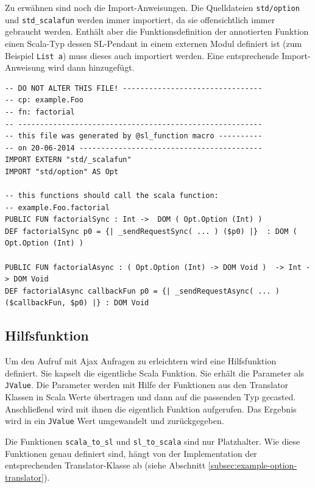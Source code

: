 \documentclass[12pt,bibtotoc]{scrreprt}
\begin{document}
Zu erwähnen sind noch die Import-Anweisungen. Die Quelldateien \lstinline!std/option! und \lstinline!std_scalafun! werden immer importiert, da sie offensichtlich immer gebraucht werden. Enthält aber die Funktionsdefinition der annotierten Funktion einen Scala-Typ dessen SL-Pendant in einem externen Modul definiert ist (zum Beispiel \lstinline!List a!) muss dieses auch importiert werden. Eine entsprechende Import-Anweisung wird dann hinzugefügt.

\begin{lstlisting}[caption=SL-Modul factorial.sl zur Funktion aus Listing \ref{lst:example-function}, label=lst:example-sl-modul, float=h]
-- DO NOT ALTER THIS FILE! --------------------------------
-- cp: example.Foo
-- fn: factorial
-- --------------------------------------------------------
-- this file was generated by @sl_function macro ----------
-- on 20-06-2014 ------------------------------------------
IMPORT EXTERN "std/_scalafun"
IMPORT "std/option" AS Opt

-- this functions should call the scala function:
-- example.Foo.factorial
PUBLIC FUN factorialSync : Int ->  DOM ( Opt.Option (Int) )
DEF factorialSync p0 = {| _sendRequestSync( ... ) ($p0) |}  : DOM ( Opt.Option (Int) )

PUBLIC FUN factorialAsync : ( Opt.Option (Int) -> DOM Void )  -> Int -> DOM Void
DEF factorialAsync callbackFun p0 = {| _sendRequestAsync( ... )  ($callbackFun, $p0) |} : DOM Void
\end{lstlisting}

\subsection{Hilfsfunktion}
\label{subsec:helperfunction}

Um den Aufruf mit Ajax Anfragen zu erleichtern wird eine Hilfsfunktion definiert. Sie kapselt die eigentliche Scala Funktion. Sie erhält die Parameter als \lstinline!JValue!. Die Parameter werden mit Hilfe der Funktionen aus den Translator Klassen in Scala Werte übertragen und dann auf die passenden Typ gecasted. Anschließend wird mit ihnen die eigentlich Funktion aufgerufen. Das Ergebnis wird in ein \lstinline!JValue! Wert umgewandelt und zurückgegeben.

Die Funktionen \lstinline!scala_to_sl! und \lstinline!sl_to_scala! sind nur Platzhalter. Wie diese Funktionen genau definiert sind, hängt von der Implementation der entsprechenden Translator-Klasse ab (siehe Abschnitt \ref{subsec:example-option-translator}).
\end{document}
